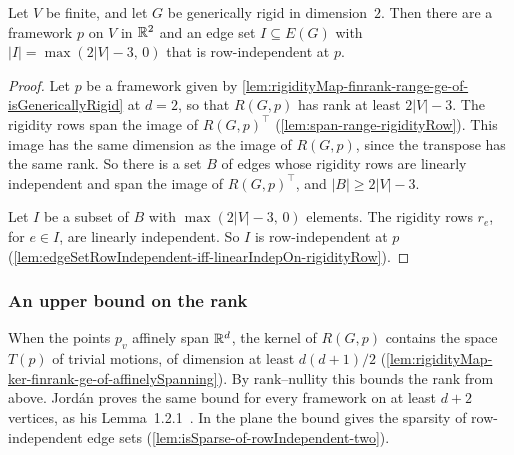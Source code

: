 \begin{lemma}
  \label{lem:exists-rowIndependent-edge-basis}
  \leanok
  Let $V$ be finite, and let $G$ be generically rigid in
  dimension~$2$. Then there are a framework $p$ on $V$ in ${\mathbb{R}}^{2}$ and
  an edge set $I \subseteq E(G)$ with $|I| = \max(2|V| - 3,\, 0)$ that
  is row-independent at $p$.
\end{lemma}
\begin{proof}
  \leanok
  Let $p$ be a framework given by
  \cref{lem:rigidityMap-finrank-range-ge-of-isGenericallyRigid} at
  $d = 2$, so that $R(G, p)$ has rank at least $2|V| - 3$. The rigidity
  rows span the image of $R(G, p)^{\top}$
  (\cref{lem:span-range-rigidityRow}). This image has the same
  dimension as the image of $R(G, p)$, since the transpose has the same
  rank. So there is a set $B$ of edges whose rigidity rows are linearly
  independent and span the image of $R(G, p)^{\top}$, and
  $|B| \ge 2|V| - 3$.

  Let $I$ be a subset of $B$ with $\max(2|V| - 3,\, 0)$ elements. The
  rigidity rows $r_e$, for $e \in I$, are linearly independent. So $I$
  is row-independent at $p$
  (\cref{lem:edgeSetRowIndependent-iff-linearIndepOn-rigidityRow}).
\end{proof}

\subsubsection{An upper bound on the rank}

When the points $p_v$ affinely span ${\mathbb{R}}^{d}$, the kernel of $R(G, p)$
contains the space $T(p)$ of trivial motions, of dimension at least
$d(d+1)/2$ (\cref{lem:rigidityMap-ker-finrank-ge-of-affinelySpanning}).
By rank--nullity this bounds the rank from above. Jord\'an proves the
same bound for every framework on at least $d + 2$ vertices, as his
Lemma~1.2.1~\cite{jordan2016}. In the plane the bound gives the
sparsity of row-independent edge sets
(\cref{lem:isSparse-of-rowIndependent-two}).

